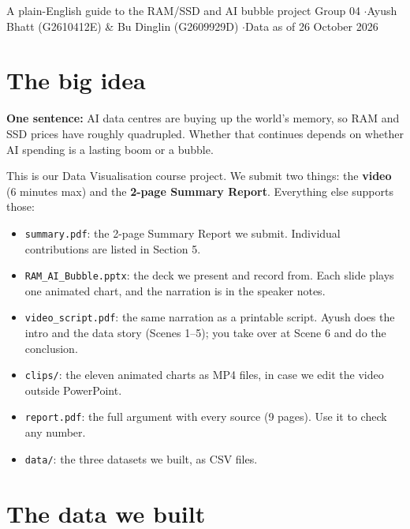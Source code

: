 \documentclass[11pt]{article}
\begin{document}
{A plain-English guide to the RAM/SSD and AI bubble project}
{Group 04 \quad$\cdot$\quad Ayush Bhatt (G2610412E) \& Bu Dinglin (G2609929D) \quad$\cdot$\quad Data as of 26 October 2026}

\section*{The big idea}

\begin{keybox}
\textbf{One sentence:} AI data centres are buying up the world's memory, so RAM and SSD prices have roughly quadrupled. Whether that continues depends on whether AI spending is a lasting boom or a bubble.
\end{keybox}

This is our Data Visualisation course project. We submit two things: the \textbf{video} (6 minutes max) and the \textbf{2-page Summary Report}. Everything else supports those:
\begin{itemize}
  \item \texttt{summary.pdf}: the 2-page Summary Report we submit. Individual contributions are listed in Section 5.
  \item \texttt{RAM\_AI\_Bubble.pptx}: the deck we present and record from. Each slide plays one animated chart, and the narration is in the speaker notes.
  \item \texttt{video\_script.pdf}: the same narration as a printable script. Ayush does the intro and the data story (Scenes 1--5); you take over at Scene 6 and do the conclusion.
  \item \texttt{clips/}: the eleven animated charts as MP4 files, in case we edit the video outside PowerPoint.
  \item \texttt{report.pdf}: the full argument with every source (9 pages). Use it to check any number.
  \item \texttt{data/}: the three datasets we built, as CSV files.
\end{itemize}

\section*{The data we built}
\end{document}
